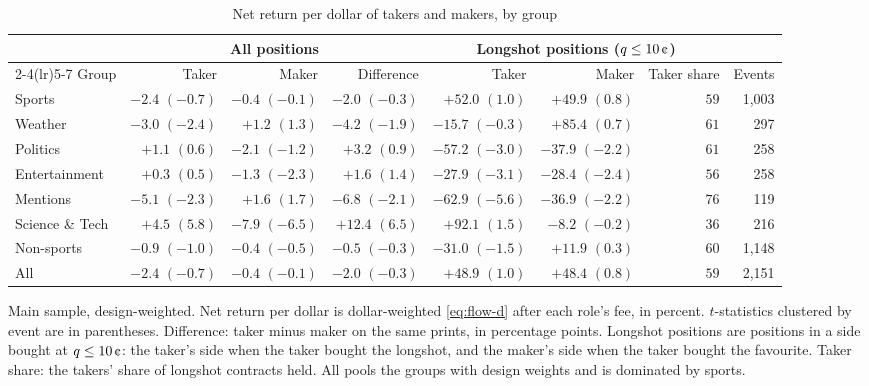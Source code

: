\begin{table}[htbp]
\centering
\begin{threeparttable}
\caption{Net return per dollar of takers and makers, by group}\label{tab:flow-roles}
\footnotesize
\setlength{\tabcolsep}{4pt}
\begin{tabular}{@{}lrrrrrrr@{}}
\toprule
 & \multicolumn{3}{c}{All positions} & \multicolumn{3}{c}{Longshot positions ($\q\le10\cents$)} & \\
\cmidrule(lr){2-4}\cmidrule(lr){5-7}
Group & Taker & Maker & Difference & Taker & Maker & Taker share & Events \\
\midrule
Sports & $-2.4$ $(-0.7)$ & $-0.4$ $(-0.1)$ & $-2.0$ $(-0.3)$ & $+52.0$ $(1.0)$ & $+49.9$ $(0.8)$ & $59$ & 1,003 \\
Weather & $-3.0$ $(-2.4)$ & $+1.2$ $(1.3)$ & $-4.2$ $(-1.9)$ & $-15.7$ $(-0.3)$ & $+85.4$ $(0.7)$ & $61$ & 297 \\
Politics & $+1.1$ $(0.6)$ & $-2.1$ $(-1.2)$ & $+3.2$ $(0.9)$ & $-57.2$ $(-3.0)$ & $-37.9$ $(-2.2)$ & $61$ & 258 \\
Entertainment & $+0.3$ $(0.5)$ & $-1.3$ $(-2.3)$ & $+1.6$ $(1.4)$ & $-27.9$ $(-3.1)$ & $-28.4$ $(-2.4)$ & $56$ & 258 \\
Mentions & $-5.1$ $(-2.3)$ & $+1.6$ $(1.7)$ & $-6.8$ $(-2.1)$ & $-62.9$ $(-5.6)$ & $-36.9$ $(-2.2)$ & $76$ & 119 \\
Science \& Tech & $+4.5$ $(5.8)$ & $-7.9$ $(-6.5)$ & $+12.4$ $(6.5)$ & $+92.1$ $(1.5)$ & $-8.2$ $(-0.2)$ & $36$ & 216 \\
\midrule
Non-sports & $-0.9$ $(-1.0)$ & $-0.4$ $(-0.5)$ & $-0.5$ $(-0.3)$ & $-31.0$ $(-1.5)$ & $+11.9$ $(0.3)$ & $60$ & 1,148 \\
All & $-2.4$ $(-0.7)$ & $-0.4$ $(-0.1)$ & $-2.0$ $(-0.3)$ & $+48.9$ $(1.0)$ & $+48.4$ $(0.8)$ & $59$ & 2,151 \\
\bottomrule
\end{tabular}
\begin{tablenotes}\footnotesize
\item Main sample, design-weighted. Net return per dollar is dollar-weighted
\eqref{eq:flow-d} after each role's fee, in percent. $t$-statistics clustered by event are in
parentheses. Difference: taker minus maker on the same prints, in percentage points.
Longshot positions are positions in a side bought at $\q\le10\cents$: the taker's side when the
taker bought the longshot, and the maker's side when the taker bought the favourite. Taker share:
the takers' share of longshot contracts held. All pools the groups with design weights and is
dominated by sports.
\end{tablenotes}
\end{threeparttable}
\end{table}

